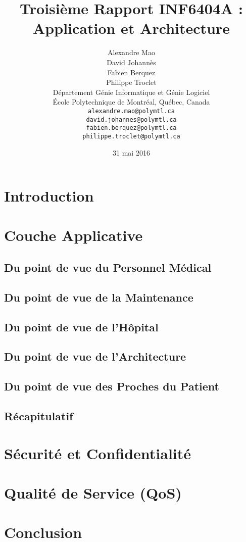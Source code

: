 \documentclass{article}
\title{Troisième Rapport INF6404A : Application et Architecture}
\author{
	Alexandre Mao\\
	David Johannès \\
	Fabien Berquez \\
	Philippe Troclet \\
	D\'{e}partement G\'{e}nie Informatique et G\'{e}nie Logiciel \\
	\'{E}cole Polytechnique de Montr\'{e}al, Qu\'{e}bec, Canada \\
	\texttt{alexandre.mao@polymtl.ca}\\
	\texttt{david.johannes@polymtl.ca}\\
	\texttt{fabien.berquez@polymtl.ca}   \\
	\texttt{philippe.troclet@polymtl.ca}   \\
}
\date{31 mai 2016}
\begin{document}
\maketitle

\section{Introduction}


 
\section{Couche Applicative}
\subsection{Du point de vue du Personnel Médical}

\subsection{Du point de vue de la Maintenance}

\subsection{Du point de vue de l'Hôpital}

\subsection{Du point de vue de l'Architecture}

\subsection{Du point de vue des Proches du Patient}

\subsection{Récapitulatif}


\section{Sécurité et Confidentialité}


\section{Qualité de Service (QoS)}


\section{Conclusion}










\end{document}
